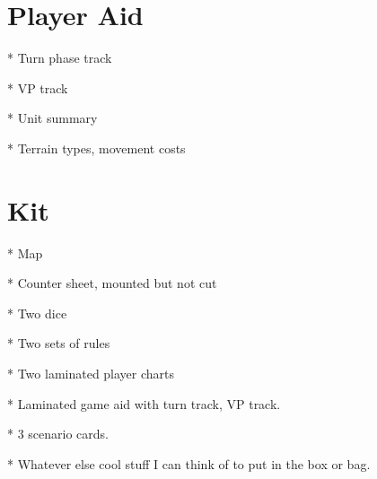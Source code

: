 \documentclass[10pt]{article}
\begin{document}
\section*{Player Aid}

* Turn phase track

* VP track

* Unit summary

* Terrain types, movement costs

\section*{Kit}

* Map

* Counter sheet, mounted but not cut

* Two dice

* Two sets of rules

* Two laminated player charts

* Laminated game aid with turn track, VP track.

* 3 scenario cards.

* Whatever else cool stuff I can think of to put in the box or bag.

\end{document}
